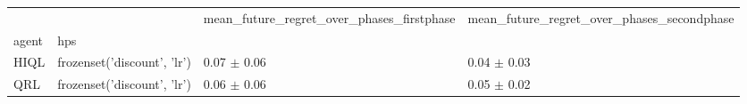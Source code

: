 \begin{tabular}{llll}
\toprule
 &  & mean_future_regret_over_phases_firstphase & mean_future_regret_over_phases_secondphase \\
agent & hps &  &  \\
\midrule
HIQL & frozenset({'discount', 'lr'}) & 0.07 $\pm$ 0.06 & 0.04 $\pm$ 0.03 \\
\cline{1-4}
QRL & frozenset({'discount', 'lr'}) & 0.06 $\pm$ 0.06 & 0.05 $\pm$ 0.02 \\
\cline{1-4}
\bottomrule
\end{tabular}
